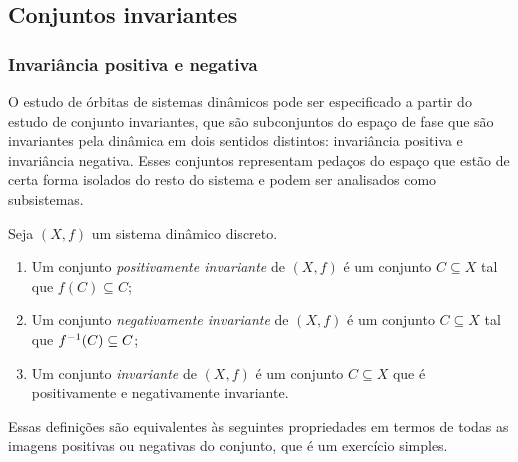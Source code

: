 \subsection{Conjuntos invariantes}

\subsubsection{Invariância positiva e negativa}

O estudo de órbitas de sistemas dinâmicos pode ser especificado a partir do estudo de conjunto invariantes, que são subconjuntos do espaço de fase que são invariantes pela dinâmica em dois sentidos distintos: invariância positiva e invariância negativa. Esses conjuntos representam pedaços do espaço que estão de certa forma isolados do resto do sistema e podem ser analisados como subsistemas.

\begin{definition}
Seja $(X,f)$ um sistema dinâmico discreto.
	\begin{enumerate}
	\item Um conjunto \emph{positivamente invariante} de $(X,f)$ é um conjunto $C \subseteq X$ tal que $f(C) \subseteq C$;
	\item Um conjunto \emph{negativamente invariante} de $(X,f)$ é um conjunto $C \subseteq X$ tal que $f^{-1}(C) \subseteq C$;
	\item Um conjunto \emph{invariante} de $(X,f)$ é um conjunto $C \subseteq X$ que é positivamente e negativamente invariante.
	\end{enumerate}
\end{definition}

Essas definições são equivalentes às seguintes propriedades em termos de todas as imagens positivas ou negativas do conjunto, que é um exercício simples.

